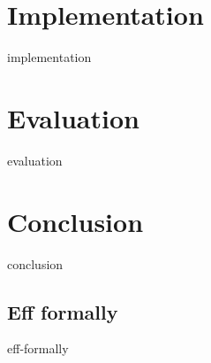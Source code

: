 \documentclass[oneside]{scrbook}
\begin{document}
\chapter{Implementation}
{implementation}

\chapter{Evaluation}
{evaluation}

\chapter{Conclusion}
{conclusion}

\begin{appendices}
    \chapter{Eff formally}
    {eff-formally}
\end{appendices}

{}

\end{document}
